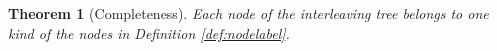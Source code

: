 \documentclass[runningheads]{llncs}
\newtheorem{myTheo}{Theorem}
\begin{document}
\begin{myTheo}[Completeness]
    Each node of the interleaving tree belongs to one kind of the nodes in Definition \ref{def:nodelabel}.
\end{myTheo}

\end{document}
